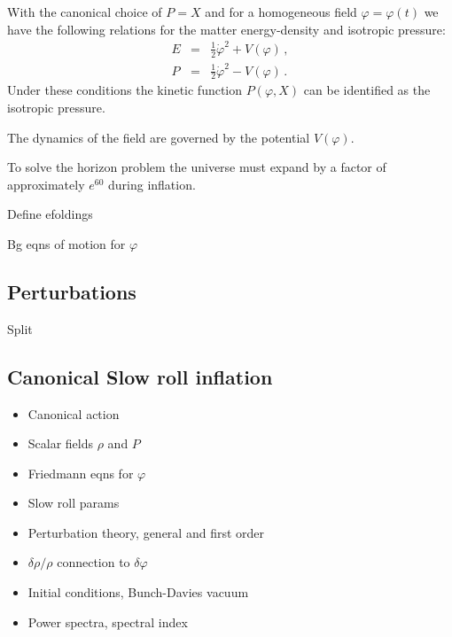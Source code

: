 With the canonical choice of $P=X$ and for a homogeneous field
$\varphi=\varphi(t)$ we have the following relations for the matter
energy-density and isotropic pressure:
\begin{eqnarray}
 E &=& \frac{1}{2}\dot{\varphi}^2 + V(\varphi) \,,\\
 P &=& \frac{1}{2}\dot{\varphi}^2 - V(\varphi) \,.
\end{eqnarray}
Under these conditions the kinetic function $P(\varphi, X)$ can be identified as
the isotropic pressure.

The dynamics of the field are governed by the potential $V(\varphi)$. 

To solve the horizon problem the universe must expand by a factor of
approximately $e^{60}$ during inflation. 

Define efoldings

Bg eqns of motion for $\varphi$


\subsection{Perturbations}
\label{sec:perts-intro}
Split






\subsection{Canonical Slow roll inflation}
\label{sec:slowroll-intro}
\begin{itemize}
 \item Canonical action
 \item Scalar fields $\rho$ and $P$
 \item Friedmann eqns for $\varphi$
 \item Slow roll params
 \item Perturbation theory, general and first order
 \item $\delta\rho/\rho$ connection to $\delta \varphi$
 \item Initial conditions, Bunch-Davies vacuum
 \item  Power spectra, spectral index
\end{itemize}



